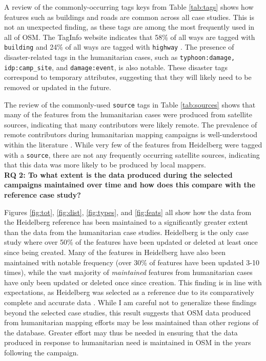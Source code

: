 A review of the commonly-occurring tags keys from Table \ref{tab:tags} shows how features such as buildings and roads are common across all case studies. This is not an unexpected finding, as these tags are among the most frequently used in all of OSM. The TagInfo website indicates that 58\% of all ways are tagged with \texttt{building} and 24\% of all ways are tagged with \texttt{highway} \parencite{openstreetmap_contributors_openstreetmap_2020}. The presence of disaster-related tags in the humanitarian cases, such as \texttt{typhoon:damage, idp:camp_site}, and \texttt{damage:event}, is also notable. These disaster tags correspond to temporary attributes, suggesting that they will likely need to be removed or updated in the future. 

The review of the commonly-used \texttt{source} tags in Table \ref{tab:sources} shows that many of the features from the humanitarian cases were produced from satellite sources, indicating that many contributors were likely remote. The prevalence of remote contributors during humanitarian mapping campaigns is well-understood within the literature \parencite{dittus_mass_2017, eckle_quality_2015}. While very few of the features from Heidelberg were tagged with a \texttt{source}, there are not any frequently occurring satellite sources, indicating that this data was more likely to be produced by local mappers. \\

\noindent\textbf{RQ 2: To what extent is the data produced during the selected campaigns maintained over time and how does this compare with the reference case study?}

Figures \ref{fig:tot}, \ref{fig:dist}, \ref{fig:types}, and \ref{fig:feats} all show how the data from the Heidelberg reference has been maintained to a significantly greater extent than the data from the humanitarian case studies. Heidelberg is the only case study where over 50\% of the features have been updated or deleted at least once since being created. Many of the features in Heidelberg have also been maintained with notable frequency (over 30\% of features have been updated 3-10 times), while the vast majority of \textit{maintained} features from humanitarian cases have only been updated or deleted once since creation. This finding is in line with expectations, as Heidelberg was selected as a reference due to its comparatively complete and accurate data \parencite{arsanjani_assessing_2013}. While I am careful not to generalize these findings beyond the selected case studies, this result suggests that OSM data produced from humanitarian mapping efforts may be less maintained than other regions of the database. Greater effort may thus be needed in ensuring that the data produced in response to humanitarian need is maintained in OSM in the years following the campaign. 

